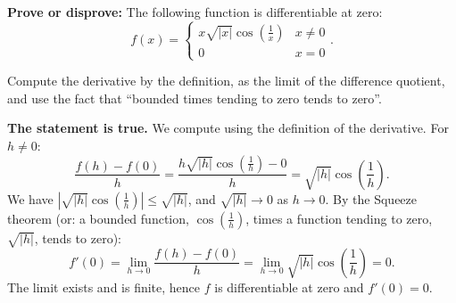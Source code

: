 
\begin{question}
\textbf{Prove or disprove:} The following function is differentiable at zero:
\[ f(x)=\begin{cases} x\sqrt{|x|}\cos(\frac{1}{x}) & x\neq 0\\ 0 & x=0\end{cases}. \]
\end{question}

\begin{hint}
Compute the derivative by the definition, as the limit of the difference quotient, and use the fact that ``bounded times tending to zero tends to zero''.
\end{hint}

\begin{solution}
\textbf{The statement is true.} We compute using the definition of the derivative. For $h\neq 0$:
\[ \frac{f(h)-f(0)}{h}=\frac{h\sqrt{|h|}\cos(\frac1h)-0}{h}=\sqrt{|h|}\cos\!\left(\frac1h\right). \]
We have $\left|\sqrt{|h|}\cos(\frac1h)\right|\le \sqrt{|h|}$, and $\sqrt{|h|}\to 0$ as $h\to 0$. By the Squeeze theorem (or: a bounded function, $\cos(\frac1h)$, times a function tending to zero, $\sqrt{|h|}$, tends to zero):
\[ f'(0)=\lim_{h\to 0}\frac{f(h)-f(0)}{h}=\lim_{h\to0}\sqrt{|h|}\cos\!\left(\frac1h\right)=0. \]
The limit exists and is finite, hence $f$ is differentiable at zero and $\boxed{f'(0)=0}$.
\end{solution}
